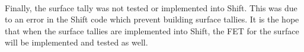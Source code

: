 \documentclass[10tma4paper]{article}
\begin{document}
\\
Finally, the surface tally was not tested or implemented into Shift. This was due to an error in the Shift code which prevent building surface tallies. It is the hope that when the surface tallies are implemented into Shift, the FET for the surface will be implemented and tested as well.



\end{document}
